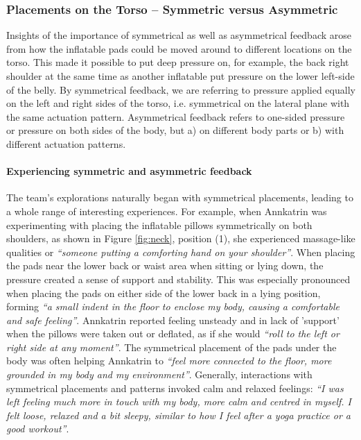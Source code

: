 \subsubsection{Placements on the Torso -- Symmetric versus Asymmetric}

Insights of the importance of symmetrical as well as asymmetrical feedback arose from how the inflatable pads could be moved around to different locations on the torso. This made it possible to put deep pressure on, for example, the back right shoulder at the same time as another inflatable put pressure on the lower left-side of the belly. By symmetrical feedback, we are referring to pressure applied equally on the left and right sides of the torso, i.e. symmetrical on the lateral plane with the same actuation pattern. Asymmetrical feedback refers to one-sided pressure or pressure on both sides of the body, but a) on different body parts or b) with different actuation patterns.


\paragraph{Experiencing symmetric and asymmetric feedback}

The team's explorations naturally began with symmetrical placements, leading to a whole range of interesting experiences. For example, when Annkatrin was experimenting with placing the inflatable pillows symmetrically on both shoulders, as shown in Figure \ref{fig:neck}, position (1), she experienced massage-like qualities or \textit{``someone putting a comforting hand on your shoulder''}. When placing the pads near the lower back or waist area when sitting or lying down, the pressure created a sense of support and stability. This was especially pronounced when placing the pads on either side of the lower back in a lying position, forming \textit{``a small indent in the floor to enclose my body, causing a comfortable and safe feeling''}. Annkatrin reported feeling unsteady and in lack of 'support' when the pillows were taken out or deflated, as if she would \textit{``roll to the left or right side at any moment''}. The symmetrical placement of the pads under the body was often helping Annkatrin to \textit{``feel more connected to the floor, more grounded in my body and my environment''}. Generally, interactions with symmetrical placements and patterns invoked calm and relaxed feelings: \textit{``I was left feeling much more in touch with my body, more calm and centred in myself. I felt loose, relaxed and a bit sleepy, similar to how I feel after a yoga practice or a good workout''}.

